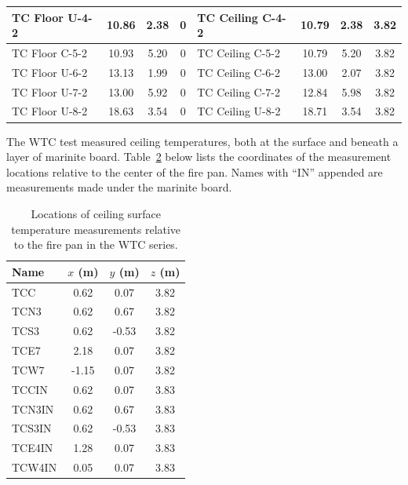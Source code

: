 \begin{table}[p]
\begin{center}
\begin{tabular}{|l|c|c|c||l|c|c|c|}
TC Floor U-4-2    & 10.86 & 2.38 & 0        & TC Ceiling C-4-2  & 10.79 & 2.38  & 3.82      \\ \hline
TC Floor C-5-2    & 10.93 & 5.20 & 0        & TC Ceiling C-5-2  & 10.79 & 5.20  & 3.82      \\ \hline
TC Floor U-6-2    & 13.13 & 1.99 & 0        & TC Ceiling C-6-2  & 13.00 & 2.07  & 3.82      \\ \hline
TC Floor U-7-2    & 13.00 & 5.92 & 0        & TC Ceiling C-7-2  & 12.84 & 5.98  & 3.82      \\ \hline
TC Floor U-8-2    & 18.63 & 3.54 & 0        & TC Ceiling U-8-2  & 18.71 & 3.54  & 3.82      \\ \hline
\end{tabular}
\end{center}
\label{NIST_NRC_Wall_Coords}
\end{table}

The WTC test measured ceiling temperatures, both at the surface and beneath a layer of marinite board. Table~\ref{WTC_Ceiling_Coords} below lists the coordinates of the measurement locations relative to the center of the fire pan. Names with ``IN'' appended are measurements made under the marinite board.

\begin{table}[h!]
\caption[Ceiling surface measurement locations for the WTC series]{Locations of ceiling surface temperature measurements relative to the fire pan in the WTC series.}
\begin{center}
\begin{tabular}{|l|c|c|c|}
\hline
Name                & $x$ (m)   & $y$ (m)   & $z$ (m)   \\ \hline \hline
TCC                 & 0.62      & 0.07      & 3.82      \\ \hline
TCN3                & 0.62      & 0.67      & 3.82      \\ \hline
TCS3                & 0.62      & -0.53     & 3.82      \\ \hline
TCE7                & 2.18      & 0.07      & 3.82      \\ \hline
TCW7                & -1.15     & 0.07      & 3.82      \\ \hline \hline
TCCIN               & 0.62      & 0.07      & 3.83      \\ \hline
TCN3IN              & 0.62      & 0.67      & 3.83      \\ \hline
TCS3IN              & 0.62      & -0.53     & 3.83      \\ \hline
TCE4IN              & 1.28      & 0.07      & 3.83      \\ \hline
TCW4IN              & 0.05      & 0.07      & 3.83      \\ \hline
\end{tabular}
\end{center}
\label{WTC_Ceiling_Coords}
\end{table}

